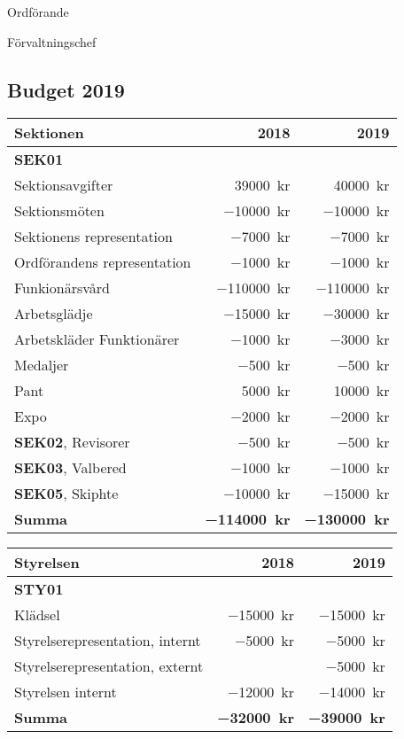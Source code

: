 \documentclass[../_main/handlingar.tex]{subfiles}
\begin{document}
\begin{signatures}{2}
    \ist
    \signature{\ordf}{Ordförande}
    \signature{\fvc}{Förvaltningschef}
\end{signatures}

\newpage
\subsection*{Budget 2019}
\begin{tabularx}{10cm}{X r r}
    \textbf{\large Sektionen} & \textbf{2018} & \textbf{2019} \\
    \hline
    \textbf{SEK01} \\
    Sektionsavgifter & \SI{39000}{kr} & \SI{40000}{kr} \\
    Sektionsmöten & \SI{-10000}{kr} & \SI{-10000}{kr} \\
    Sektionens representation & \SI{-7000}{kr} & \SI{-7000}{kr} \\
    Ordförandens representation & \SI{-1000}{kr} & \SI{-1000}{kr} \\
    Funkionärsvård & \SI{-110000}{kr} & \SI{-110000}{kr} \\
    Arbetsglädje & \SI{-15000}{kr} & \SI{-30000}{kr} \\
    Arbetskläder Funktionärer & \SI{-1000}{kr} & \SI{-3000}{kr} \\
    Medaljer & \SI{-500}{kr} & \SI{-500}{kr} \\
    Pant & \SI{5000}{kr} & \SI{10000}{kr} \\
    Expo & \SI{-2000}{kr} & \SI{-2000}{kr} \\
    \textbf{SEK02}, Revisorer & \SI{-500}{kr} & \SI{-500}{kr} \\
    \textbf{SEK03}, Valbered & \SI{-1000}{kr} & \SI{-1000}{kr} \\
    \textbf{SEK05}, Skiphte & \SI{-10000}{kr} & \SI{-15000}{kr} \\
    \hline
    \textbf{Summa} & \textbf{\SI{-114000}{kr}} & \textbf{\SI{-130000}{kr}} \\
\end{tabularx}

\begin{tabularx}{10cm}{X r r}
    \textbf{\large Styrelsen} & \textbf{2018} & \textbf{2019} \\
    \hline
    \textbf{STY01} \\
    Klädsel & \SI{-15000}{kr} & \SI{-15000}{kr} \\
    Styrelserepresentation, internt & \SI{-5000}{kr} & \SI{-5000}{kr} \\
    Styrelserepresentation, externt & \SI{}{} & \SI{-5000}{kr} \\
    Styrelsen internt & \SI{-12000}{kr} & \SI{-14000}{kr} \\
    \hline
    \textbf{Summa} & \textbf{\SI{-32000}{kr}} & \textbf{\SI{-39000}{kr}} \\
\end{tabularx}
\end{document}
